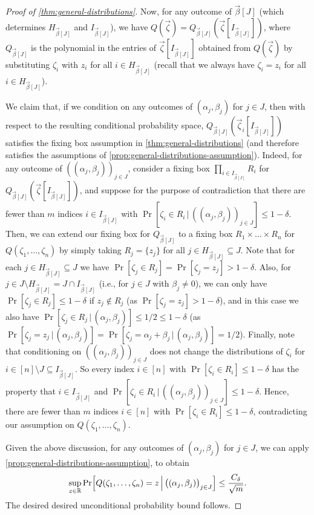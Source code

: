 \documentclass[english]{article}
\theoremstyle{remark}
\numberwithin{equation}{section}
\numberwithin{figure}{section}
\newcommand{\su}{\subseteq}
\newcommand{\RR}{\mathbb{R}}
\begin{document}
\begin{proof}[Proof of \cref{thm:general-distributions}]
Now, for any outcome of $\vec \beta[J]$ (which determines $H_{\vec \beta[J]}$ and $I_{\vec \beta[J]}$), we have $Q(\vec \zeta)=Q_{\vec\beta[J]}(\vec \zeta[I_{\vec \beta[J]}])$, where $Q_{\vec\beta[J]}$ is the polynomial in the entries of $\vec \zeta[I_{\vec \beta[J]}]$ obtained from $Q(\vec \zeta)$ by substituting $\zeta_i$ with $z_i$ for all $i\in H_{\vec \beta[J]}$ (recall that we always have $\zeta_i=z_i$ for all $i\in H_{\vec \beta[J]}$).

We claim that, if we condition on any outcomes of $(\alpha_j,\beta_j)$ for $j\in J$,
then with respect to the resulting conditional probability space, $Q_{\vec\beta[J]}(\vec \zeta_i[I_{\vec \beta[J]}])$ satisfies the fixing box assumption in \cref{thm:general-distributions} (and therefore satisfies the assumptions of \cref{prop:general-distributions-assumption}). Indeed, for any outcome of $((\alpha_j,\beta_j))_{j\in J}$, consider a fixing box $\prod_{i\in I_{\vec \beta[J]}} R_i$ for $Q_{\vec\beta[J]}(\vec \zeta[I_{\vec \beta[J]}])$, and
suppose for the purpose of contradiction that there are fewer than $m$ indices $i\in I_{\vec \beta[J]}$ with $\Pr[\zeta_i\in R_i\,|\,((\alpha_j,\beta_j))_{j\in J}]\le 1-\delta$. Then, we can extend our fixing box for $Q_{\vec\beta[J]}$ to a fixing box $R_1\times \dots\times R_n$ for $Q(\zeta_1,\dots,\zeta_n)$ by simply taking $R_j=\{z_j\}$ for all $j\in H_{\vec \beta[J]}\su J$. Note that for each $j\in H_{\vec \beta[J]}\su J$ we have $\Pr[\zeta_j\in R_j]=\Pr[\zeta_j=z_j]>1-\delta$. Also, for $j\in J\setminus H_{\vec \beta[J]}=J\cap I_{\vec \beta[J]}$ (i.e., for $j\in J$ with $\beta_j\ne 0$), we can only have $\Pr[\zeta_j\in R_j]\le 1-\delta$ if $z_j\not\in R_j$ (as $\Pr[\zeta_j=z_j]> 1-\delta$), and in this case we also have $\Pr[\zeta_j\in R_j\,|\,(\alpha_j,\beta_j)]\le 1/2\le 1-\delta$ (as $\Pr[\zeta_j=z_j\,|\,(\alpha_j,\beta_j)]=\Pr[\zeta_j=\alpha_j+\beta_j\,|\,(\alpha_j,\beta_j)]=1/2$). Finally, note that conditioning on $((\alpha_j,\beta_j))_{j\in J}$ does not change the distributions of $\zeta_i$ for $i\in [n]\setminus J\su I_{\vec \beta[J]}$.
So every index $i\in [n]$ with $\Pr[\zeta_i\in R_i]\le 1-\delta$ has the property that $i\in I_{\vec \beta[J]}$ and $\Pr[\zeta_i\in R_i\,|\,((\alpha_j,\beta_j))_{j\in J}]\le 1-\delta$. Hence, there are fewer than $m$ indices $i\in [n]$ with $\Pr[\zeta_i\in R_i]\le 1-\delta$, contradicting our assumption on $Q(\zeta_1,\dots,\zeta_n)$.
    
Given the above discussion, for any outcomes of $(\alpha_j,\beta_j)$ for $j\in J$, we can apply \cref{prop:general-distributions-assumption}, to obtain
    \[\sup_{z\in\RR} \Pr\Bigl[Q(\zeta_1,\dots,\zeta_n)=z\,\Big|\,\bigl((\alpha_j,\beta_j)\bigr)_{j\in J}\Bigr]\le \frac{C_\delta}{\sqrt{m}}.\]
    The desired desired unconditional probability bound follows.
\end{proof}
\end{document}
